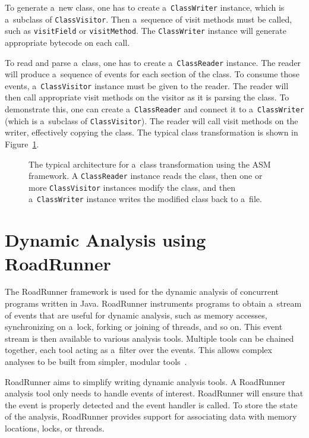 To generate a~new class, one has to create a~\texttt{ClassWriter} instance,
which is a~subclass of \texttt{ClassVisitor}. Then a~sequence of visit methods
must be called, such as \texttt{visitField} or \texttt{visitMethod}. The
\texttt{ClassWriter} instance will generate appropriate bytecode on each call.

To read and parse a~class, one has to create a~\texttt{ClassReader} instance.
The reader will produce a~sequence of events for each section of the class. To
consume those events, a~\texttt{ClassVisitor} instance must be given to the
reader. The reader will then call appropriate visit methods on the visitor as it
is parsing the class. To demonstrate this, one can create a~\texttt{ClassReader}
and connect it to a~\texttt{ClassWriter} (which is a~subclass of
\texttt{ClassVisitor}). The reader will call visit methods on the writer,
effectively copying the class. The typical class transformation is shown in
Figure~\ref{asmArchitecture}.


\begin{figure}[hbt]
    \label{asmArchitecture}
    
    \caption{The typical architecture for a~class transformation using the ASM
    framework. A \texttt{ClassReader} instance reads the class, then one or more
    \texttt{ClassVisitor} instances modify the class, and then
    a~\texttt{ClassWriter} instance writes the modified class back to a~file.}
\end{figure}

\section{Dynamic Analysis using RoadRunner}
\label{roadRunnerUsage}

The RoadRunner framework is used for the dynamic analysis of concurrent programs
written in Java. RoadRunner instruments programs to obtain a~stream of events
that are useful for dynamic analysis, such as memory accesses, synchronizing on
a~lock, forking or joining of threads, and so on. This event stream is then
available to various analysis tools. Multiple tools can be chained together,
each tool acting as a~filter over the events. This allows complex analyses to be
built from simpler, modular tools~\cite{RoadRunner}.

RoadRunner aims to simplify writing dynamic analysis tools. A RoadRunner
analysis tool only needs to handle events of interest. RoadRunner will ensure
that the event is properly detected and the event handler is called. To store
the state of the analysis, RoadRunner provides support for associating data with
memory locations, locks, or threads.

